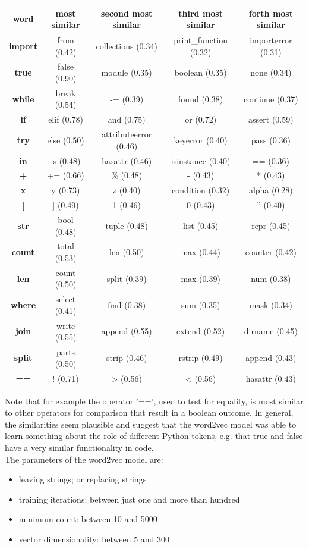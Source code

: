 \documentclass[
	a4paper,
	pagesize,
	pdftex,
	12pt,
	twoside, %
	BCOR=5mm, %
	ngerman,
	fleqn,
	final,
	]{scrartcl}
\begin{document}
\footnotesize
\begin{center}
	\begin{tabular}{ |c|c|c|c|c| } 
		\hline
		\textbf{word} & \textbf{ most similar} &\textbf{ second most similar} & \textbf{third most similar}& \textbf{forth most similar}\\ 
		\hline
		\textbf{import} & from (0.42) & collections (0.34) & print\_function (0.32) & importerror (0.31)\\ 
		\textbf{true} & false (0.90) & module (0.35) & boolean (0.35) & none (0.34)\\  
		\textbf{while} & break (0.54)  & -= (0.39) & found (0.38) & continue (0.37) \\
		\textbf{if} & elif (0.78)  & and (0.75) & or (0.72) & assert (0.59) \\
		\textbf{try} & else (0.50)  & attributeerror (0.46) & keyerror (0.40) & pass (0.36) \\
		\textbf{in} & is (0.48)  & hasattr (0.46) & isinstance (0.40) & == (0.36) \\
		\textbf{+} & += (0.66)  & \% (0.48) & - (0.43) & * (0.43) \\
		\textbf{x} & y (0.73)  & z (0.40) & condition (0.32) & alpha (0.28) \\
		\textbf{[} & ] (0.49)  & 1 (0.46) & 0 (0.43) & '' (0.40) \\
		\textbf{str} & bool (0.48)  & tuple (0.48) & list (0.45) & repr (0.45) \\
		\textbf{count} & total (0.53)  & len (0.50) & max (0.44) & counter (0.42) \\
		\textbf{len} & count (0.50)  & split (0.39) & max (0.39) & num (0.38) \\
		\textbf{where} & select (0.41)  & find (0.38) & sum (0.35) & mask (0.34) \\
		\textbf{join} & write (0.55)  & append (0.55) & extend (0.52) & dirname (0.45) \\
		\textbf{split} & parts (0.50)  & strip (0.46) & rstrip (0.49) & append (0.43) \\
		\textbf{==} & ! (0.71)  & > (0.56) & < (0.56) & hasattr (0.43) \\
		\hline
	\end{tabular}
\end{center}
\normalsize

Note that for example the operator '==', used to test for equality, is most similar to other operators for comparison that result in a boolean outcome. In general, the similarities seem plausible and suggest that the word2vec model was able to learn something about the role of different Python tokens, e.g. that true and false have a very similar functionality in code.\\ 
The parameters of the word2vec model are:
\begin{itemize}[noitemsep]
	\item leaving strings; or replacing strings
	\item training iterations: between just one and more than hundred
	\item minimum count: between 10 and 5000
	\item vector dimensionality: between 5 and 300
\end{itemize}
\end{document}
